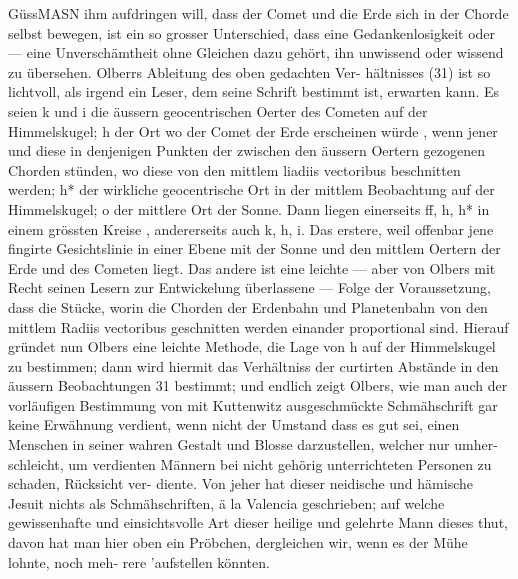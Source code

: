 \documentclass[10pt,a4paper]{article}
\begin{document}
GüssMASN  ihm  aufdringen  will,    dass  der  Comet  und   die  Erde    sich   in  der   Chorde    selbst  bewegen,   ist
ein  so  grosser  Unterschied,   dass    eine  Gedankenlosigkeit    oder  ---   eine  Unverschämtheit  ohne  Gleichen
dazu  gehört,  ihn  unwissend  oder  wissend  zu  übersehen.      Olberrs  Ableitung    des    oben   gedachten  Ver-
hältnisses   (31)    ist  so  lichtvoll,   als  irgend  ein  Leser,    dem  seine  Schrift  bestimmt  ist,    erwarten  kann.
Es  seien  k  und  i  die  äussern  geocentrischen  Oerter  des  Cometen  auf  der  Himmelskugel;   h  der  Ort     wo
der  Comet  der  Erde  erscheinen  würde ,    wenn  jener  und    diese  in  denjenigen  Punkten  der  zwischen  den
äussern  Oertern  gezogenen  Chorden  stünden,    wo   diese    von  den  mittlem  liadiis   vectoribus   beschnitten
werden;  h*  der  wirkliche  geocentrische  Ort  in  der  mittlem  Beobachtung  auf  der  Himmelskugel;    o  der
mittlere  Ort  der  Sonne.     Dann  liegen  einerseits    ff,  h,  h*   in   einem   grössten  Kreise ,    andererseits  auch
k,  h,  i.     Das  erstere,    weil   offenbar  jene   fingirte  Gesichtslinie  in   einer  Ebene  mit  der  Sonne  und  den
mittlem  Oertern  der  Erde  und  des  Cometen  liegt.     Das  andere  ist  eine  leichte  ---   aber  von  Olbers  mit
Recht  seinen  Lesern  zur  Entwickelung  überlassene  ---  Folge  der  Voraussetzung,  dass  die  Stücke,  worin
die  Chorden  der  Erdenbahn  und  Planetenbahn  von    den  mittlem  Radiis   vectoribus  geschnitten  werden
einander  proportional  sind.     Hierauf  gründet  nun  Olbers  eine  leichte  Methode,  die  Lage  von  h  auf  der
Himmelskugel  zu  bestimmen;  dann  wird  hiermit  das  Verhältniss  der  curtirten  Abstände  in  den  äussern
Beobachtungen  31  bestimmt;  und  endlich  zeigt  Olbers,  wie  man  auch  der  vorläufigen  Bestimmung  von
mit  Kuttenwitz  ausgeschmückte  Schmähschrift  gar  keine  Erwähnung  verdient,  wenn  nicht  der  Umstand
dass  es  gut  sei,  einen  Menschen  in  seiner  wahren  Gestalt  und  Blosse  darzustellen,  welcher  nur  umher-
schleicht, um  verdienten  Männern  bei  nicht  gehörig  unterrichteten  Personen  zu  schaden,  Rücksicht  ver-
diente. Von  jeher  hat  dieser  neidische  und  hämische  Jesuit  nichts  als  Schmähschriften,  ä  la  Valencia
geschrieben;  auf  welche  gewissenhafte  und  einsichtsvolle  Art  dieser  heilige  und  gelehrte  Mann  dieses
thut,  davon  hat  man  hier  oben  ein  Pröbchen,  dergleichen  wir,  wenn  es  der  Mühe  lohnte,  noch  meh-
rere 'aufstellen  könnten.
\end{document}
